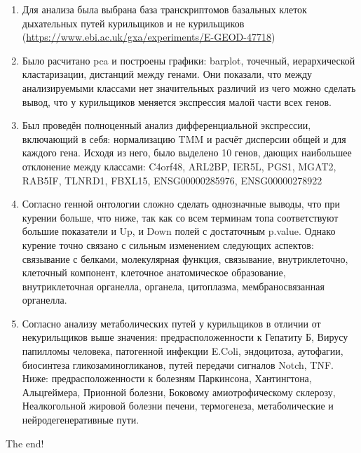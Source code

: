 \documentclass[
]{article}
\begin{document}
\begin{enumerate}
\def\labelenumi{\arabic{enumi}.}
\setcounter{enumi}{-1}
\item
  Для анализа была выбрана база транскриптомов базальных клеток
  дыхательных путей курильщиков и не курильщиков
  (\url{https://www.ebi.ac.uk/gxa/experiments/E-GEOD-47718})
\item
  Было расчитано pca и построены графики: barplot, точечный,
  иерархической кластаризации, дистанций между генами. Они показали, что
  между анализируемыми классами нет значительных различий из чего можно
  сделать вывод, что у курильщиков меняется экспрессия малой части всех
  генов.
\item
  Был проведён полноценный анализ дифференциальной экспрессии,
  включающий в себя: нормализацию TMM и расчёт дисперсии общей и для
  каждого гена. Исходя из него, было выделено 10 генов, дающих
  наибольшее отклонение между классами: C4orf48, ARL2BP, IER5L, PGS1,
  MGAT2, RAB5IF, TLNRD1, FBXL15, ENSG00000285976, ENSG00000278922
\item
  Согласно генной онтологии сложно сделать однозначные выводы, что при
  курении больше, что ниже, так как со всем терминам топа соответствуют
  большие показатели и Up, и Down полей с достаточным p.value. Однако
  курение точно связано с сильным изменением следующих аспектов:
  связывание с белками, молекулярная функция, связывание,
  внутриклеточно, клеточный компонент, клеточное анатомическое
  образование, внутриклеточная органелла, органела, цитоплазма,
  мембраносвязанная органелла.
\item
  Согласно анализу метаболических путей у курильщиков в отличии от
  некурильщиков выше значения: предрасположенности к Гепатиту Б, Вирусу
  папилломы человека, патогенной инфекции E.Coli, эндоцитоза, аутофагии,
  биосинтеза гликозаминогликанов, путей передачи сигналов Notch, TNF.
  Ниже: предрасположенности к болезням Паркинсона, Хантингтона,
  Альцгеймера, Прионной болезни, Боковому амиотрофическому склерозу,
  Неалкогольной жировой болезни печени, термогенеза, метаболические и
  нейродегенеративные пути.
\end{enumerate}

The end!
\end{document}
